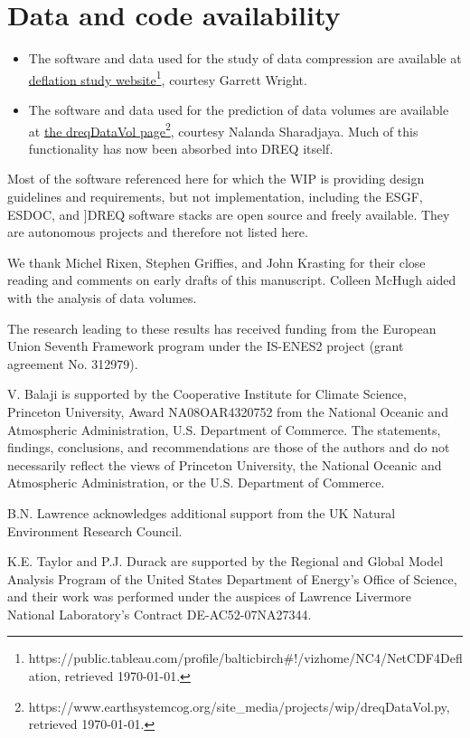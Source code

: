 \documentclass[gmd,manuscript]{copernicus}
\begin{document}
\section{Data and code availability}
\label{sec:code}

\begin{itemize}
\item The software and data used for the study of data compression are
  available at
  \href{https://public.tableau.com/profile/balticbirch\#!/vizhome/NC4/NetCDF4Deflation
  }{deflation study
    website}\footnote{https://public.tableau.com/profile/balticbirch\#!/vizhome/NC4/NetCDF4Deflation,
    retrieved \today.}, courtesy Garrett Wright.
\item The software and data used for the prediction of data volumes
  are available at
  \href{https://www.earthsystemcog.org/site_media/projects/wip/dreqDataVol.py
  }{the dreqDataVol
    page}\footnote{https://www.earthsystemcog.org/site\_media/projects/wip/dreqDataVol.py,
    retrieved \today.}, courtesy Nalanda Sharadjaya. Much of this
  functionality has now been absorbed into DREQ itself.
\end{itemize}

Most of the software referenced here for which the WIP is providing
design guidelines and requirements, but not implementation, including
the ESGF, ESDOC, and ]DREQ software stacks are open source and freely
available. They are autonomous projects and therefore not listed here.

\begin{acknowledgements}
  We thank Michel Rixen, Stephen Griffies, and John Krasting for their
  close reading and comments on early drafts of this manuscript.
  Colleen McHugh aided with the analysis of data volumes.
  
  The research leading to these results has received funding from the
  European Union Seventh Framework program under the IS-ENES2 project
  (grant agreement No. 312979).

  V. Balaji is supported by the Cooperative Institute for Climate
  Science, Princeton University, Award NA08OAR4320752 from the
  National Oceanic and Atmospheric Administration, U.S. Department of
  Commerce. The statements, findings, conclusions, and recommendations
  are those of the authors and do not necessarily reflect the views of
  Princeton University, the National Oceanic and Atmospheric
  Administration, or the U.S. Department of Commerce.

  B.N. Lawrence acknowledges additional support from the UK Natural
  Environment Research Council.
  
  K.E. Taylor and P.J. Durack are supported by the Regional and Global
  Model Analysis Program of the United States Department of Energy's
  Office of Science, and their work was performed under the auspices
  of Lawrence Livermore National Laboratory's Contract
  DE-AC52-07NA27344.
\end{acknowledgements}



\end{document}
